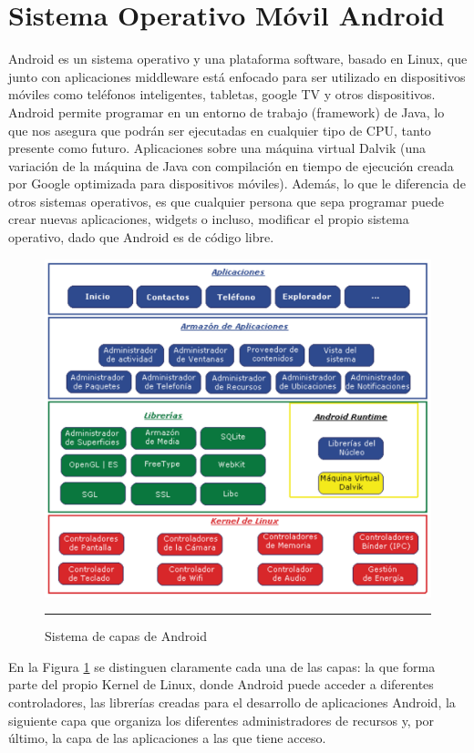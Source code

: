 \section{Sistema Operativo Móvil Android}

Android es un sistema operativo y una plataforma software, basado en Linux, que junto con aplicaciones middleware está enfocado para ser utilizado en dispositivos móviles como teléfonos inteligentes, tabletas, google TV y otros dispositivos. Android permite programar en un entorno de trabajo (framework) de Java, lo que nos asegura que podrán ser ejecutadas en cualquier tipo de CPU, tanto presente como futuro. Aplicaciones sobre una máquina virtual Dalvik (una variación de la máquina de Java con compilación en tiempo de ejecución creada por Google optimizada para dispositivos móviles). Además, lo que le diferencia de otros sistemas operativos, es que cualquier persona que sepa programar puede crear nuevas aplicaciones, widgets o incluso, modificar el propio sistema operativo, dado que Android es de código libre. \cite{Android}

\begin{figure}[htbp]
	\centering
		\includegraphics[width=1\textwidth]{Figuras/capasAndroid.png}
		\rule{30em}{0.5pt}
	\caption[Sistema de capas de Android]{Sistema de capas de Android}
	\label{fig:capasAndroid}
\end{figure}

En la Figura \ref{fig:capasAndroid} se distinguen claramente cada una de las capas: la que forma parte del propio Kernel de Linux, donde Android puede acceder a diferentes controladores, las librerías creadas para el desarrollo de aplicaciones Android, la siguiente capa que organiza los diferentes administradores de recursos y, por último, la capa de las aplicaciones a las que tiene acceso.


